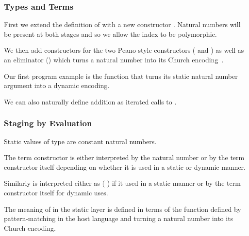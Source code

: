\documentclass{article}
\begin{document}
\subsubsection{Types and Terms}

First we extend the definition of  with a new constructor
. Natural numbers will be present at both stages and so we
allow the index to be polymorphic.


We then add  constructors for the two Peano-style
constructors ( and ) as well as an
eliminator () which turns a natural number into
its Church encoding~\cite[Chapter 3]{church1941calculi}.


Our first program example is the function  that
turns its static natural number argument into a dynamic
encoding.


We can also naturally define addition as iterated calls to
.

\label{def:add}

\subsubsection{Staging by Evaluation}

Static values of type  are constant natural numbers.


The term constructor  is either interpreted by
the natural number  or by the term constructor itself
depending on whether it is used in a static or dynamic manner.


Similarly  is interpreted either as ( \AF{+}\AS{\_})
if it used in a static manner or by the term constructor itself
for dynamic uses.


The meaning of  in the static layer is defined in
terms of the  function defined by pattern-matching
in the host language and turning a natural number into its
Church encoding.

\end{document}
